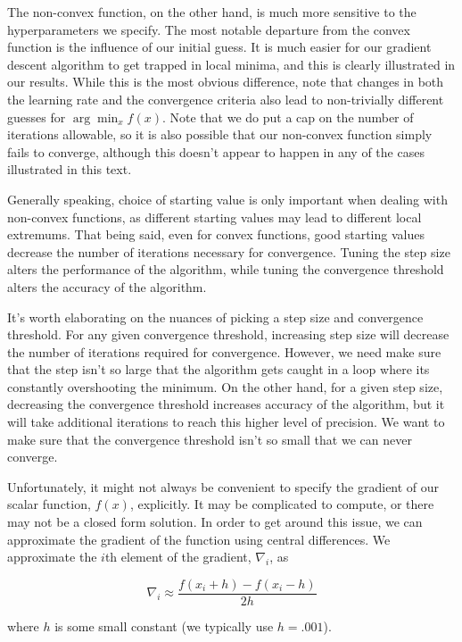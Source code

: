 \documentclass[10pt]{article}
\begin{document}
The non-convex function, on the other hand, is much more sensitive to the hyperparameters we specify. The most notable departure from the convex function is the influence of our initial guess. It is much easier for our gradient descent algorithm to get trapped in local minima, and this is clearly illustrated in our results. While this is the most obvious difference, note that changes in both the learning rate and the convergence criteria also lead to non-trivially different guesses for $\arg\min_x {f(x)}$. Note that we do put a cap on the number of iterations allowable, so it is also possible that our non-convex function simply fails to converge, although this doesn't appear to happen in any of the cases illustrated in this text.

Generally speaking, choice of starting value is only important when dealing with non-convex functions, as different starting values may lead to different local extremums. That being said, even for convex functions, good starting values decrease the number of iterations necessary for convergence. Tuning the step size alters the performance of the algorithm, while tuning the convergence threshold alters the accuracy of the algorithm.

It's worth elaborating on the nuances of picking a step size and convergence threshold. For any given convergence threshold, increasing step size will decrease the number of iterations required for convergence. However, we need make sure that the step isn't so large that the algorithm gets caught in a loop where its constantly overshooting the minimum. On the other hand, for a given step size, decreasing the convergence threshold increases accuracy of the algorithm, but it will take additional iterations to reach this higher level of precision. We want to make sure that the convergence threshold isn't so small that we can never converge.

Unfortunately, it might not always be convenient to specify the gradient of our scalar function, $f(x)$, explicitly. It may be complicated to compute, or there may not be a closed form solution. In order to get around this issue, we can approximate the gradient of the function using central differences. We approximate the $i$th element of the gradient, $\nabla_i$, as

\begin{equation}
\nabla_i \approx \frac{f(x_i+h) - f(x_i-h)}{2h}
\end{equation} 

\noindent where $h$ is some small constant (we typically use $h = .001$).
\end{document}
